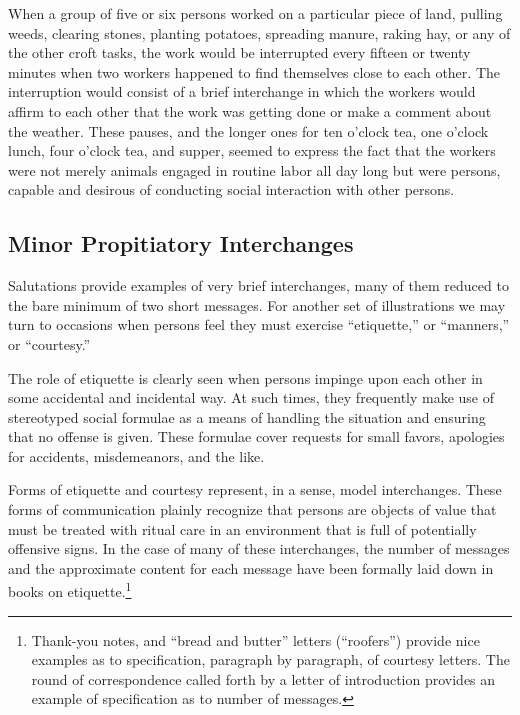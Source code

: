 \documentclass[twoside,symmetric,nobib,justified]{tufte-book}
\begin{document}
When a group of five or six persons worked on a particular piece of
land, pulling weeds, clearing stones, planting potatoes, spreading
manure, raking hay, or any of the other croft tasks, the work would be
interrupted every fifteen or twenty minutes when two workers happened to
find themselves close to each other. The interruption would consist of a
brief interchange in which the workers would affirm to each other that
the work was getting done or make a comment about the weather. These
pauses, and the longer ones for ten o'clock tea, one o'clock lunch, four
o'clock tea, and supper, seemed to express the fact that the workers
were not merely animals engaged in routine labor all day long but were
persons, capable and desirous of conducting social interaction with
other persons.

\hypertarget{minor-propitiatory-interchanges}{%
\subsection{Minor Propitiatory
Interchanges}\label{minor-propitiatory-interchanges}}

Salutations provide examples of very brief interchanges, many of them
reduced to the bare minimum of two short messages. For another set of
illustrations we may turn to occasions when persons feel they must
exercise ``etiquette,'' or ``manners,'' or ``courtesy.''

The role of etiquette is clearly seen when persons impinge upon each
other in some accidental and incidental way. At such times, they
frequently make use of stereotyped social formulae as a means of
handling the situation and ensuring that no offense is given. These
formulae cover requests for small favors, apologies for accidents,
misdemeanors, and the like.

Forms of etiquette and courtesy represent, in a sense, model
interchanges. These forms of communication plainly recognize that
persons are objects of value that must be treated with ritual care in an
environment that is full of potentially offensive signs. In the case of
many of these interchanges, the number of messages and the approximate
content for each message have been formally laid down in books on
etiquette.\footnote{Thank-you notes, and ``bread and butter'' letters
  (``roofers'') provide nice examples as to specification, paragraph by
  paragraph, of courtesy letters. The round of correspondence called
  forth by a letter of introduction provides an example of specification
  as to number of messages.}
\end{document}

